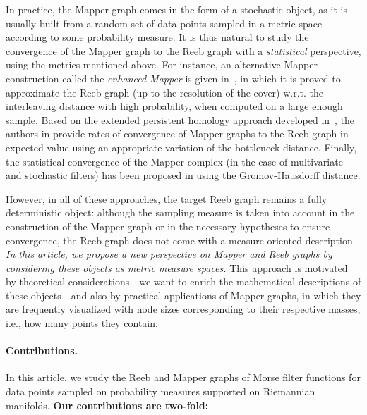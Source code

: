 In practice, the Mapper graph comes in the form of a stochastic object, as it is usually built from a random set of data points sampled in a metric space according to some probability measure. It is thus natural to study the convergence of the Mapper graph to the Reeb graph with a {\em statistical} perspective, using the metrics mentioned above. For instance, an alternative Mapper construction called the \emph{enhanced Mapper} is given in~\cite{brown2021probabilistic}, in which it is proved to approximate the Reeb graph (up to the resolution of the cover) w.r.t. the interleaving distance with high probability, when computed on a large enough sample.  Based on the extended persistent homology approach developed in~\cite{carriere2018structure}, the authors in \cite{carriere2018statistical} provide rates of convergence of Mapper graphs to the Reeb graph in expected value using an appropriate variation of the bottleneck distance.  
Finally, the statistical convergence of the Mapper complex (in the case of multivariate and stochastic filters) has been proposed in  \cite{carriere2022statistical} using the Gromov-Hausdorff distance.

However, in all of these approaches, the target Reeb graph remains a fully deterministic object: although the sampling measure is taken into account in the construction of the Mapper graph or in the necessary hypotheses to ensure convergence, the Reeb graph does not come with a measure-oriented description. {\em In this article, we propose a new perspective on Mapper and Reeb graphs by considering these objects as metric measure spaces.} This approach is motivated by theoretical considerations - we want to enrich the mathematical descriptions of these objects - and also by practical applications of Mapper graphs, in which they are frequently visualized with node sizes corresponding to their respective masses, i.e., how many points they contain. 

\paragraph{Contributions.} In this article, we study the Reeb and Mapper graphs of Morse filter functions for data points sampled on probability measures supported on Riemannian manifolds. {\bf Our contributions are two-fold:}

